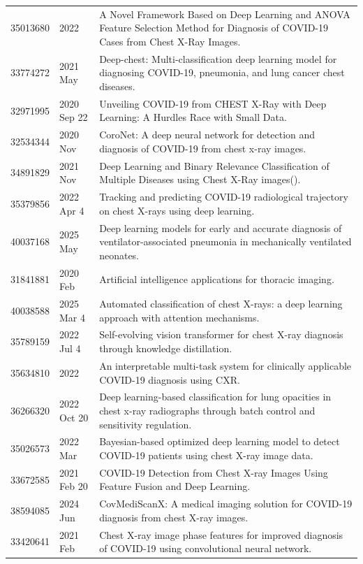 \begin{longtable}{llp{9.5cm}}
35013680 & 2022 & A Novel Framework Based on Deep Learning and ANOVA Feature Selection Method for Diagnosis of COVID-19 Cases from Chest X-Ray Images. \\
33774272 & 2021 May & Deep-chest: Multi-classification deep learning model for diagnosing COVID-19, pneumonia, and lung cancer chest diseases. \\
32971995 & 2020 Sep 22 & Unveiling COVID-19 from CHEST X-Ray with Deep Learning: A Hurdles Race with Small Data. \\
32534344 & 2020 Nov & CoroNet: A deep neural network for detection and diagnosis of COVID-19 from chest x-ray images. \\
34891829 & 2021 Nov & Deep Learning and Binary Relevance Classification of Multiple Diseases using Chest X-Ray images(). \\
35379856 & 2022 Apr 4 & Tracking and predicting COVID-19 radiological trajectory on chest X-rays using deep learning. \\
40037168 & 2025 May & Deep learning models for early and accurate diagnosis of ventilator-associated pneumonia in mechanically ventilated neonates. \\
31841881 & 2020 Feb & Artificial intelligence applications for thoracic imaging. \\
40038588 & 2025 Mar 4 & Automated classification of chest X-rays: a deep learning approach with attention mechanisms. \\
35789159 & 2022 Jul 4 & Self-evolving vision transformer for chest X-ray diagnosis through knowledge distillation. \\
35634810 & 2022 & An interpretable multi-task system for clinically applicable COVID-19 diagnosis using CXR. \\
36266320 & 2022 Oct 20 & Deep learning-based classification for lung opacities in chest x-ray radiographs through batch control and sensitivity regulation. \\
35026573 & 2022 Mar & Bayesian-based optimized deep learning model to detect COVID-19 patients using chest X-ray image data. \\
33672585 & 2021 Feb 20 & COVID-19 Detection from Chest X-ray Images Using Feature Fusion and Deep Learning. \\
38594085 & 2024 Jun & CovMediScanX: A medical imaging solution for COVID-19 diagnosis from chest X-ray images. \\
33420641 & 2021 Feb & Chest X-ray image phase features for improved diagnosis of COVID-19 using convolutional neural network. \\

\end{longtable}
